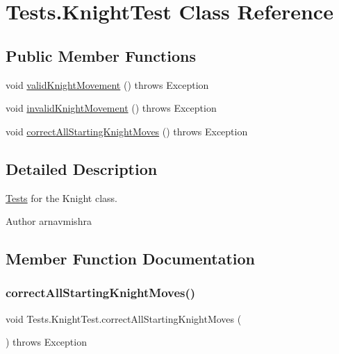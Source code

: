 \hypertarget{class_tests_1_1_knight_test}{}\section{Tests.\+Knight\+Test Class Reference}
\label{class_tests_1_1_knight_test}
\subsection*{Public Member Functions}
\begin{DoxyCompactItemize}
\item 
void \hyperlink{class_tests_1_1_knight_test_aeef4aecba7d22407c8945dabf02ae3fa}{valid\+Knight\+Movement} ()  throws Exception 
\item 
void \hyperlink{class_tests_1_1_knight_test_a2055e2c815f2c80d89a9f9519702b712}{invalid\+Knight\+Movement} ()  throws Exception 
\item 
void \hyperlink{class_tests_1_1_knight_test_a1f2b34d555e7c732d14245368341ee02}{correct\+All\+Starting\+Knight\+Moves} ()  throws Exception 
\end{DoxyCompactItemize}


\subsection{Detailed Description}
\hyperlink{namespace_tests}{Tests} for the Knight class. \begin{DoxyAuthor}{Author}
arnavmishra 
\end{DoxyAuthor}


\subsection{Member Function Documentation}
\hypertarget{class_tests_1_1_knight_test_a1f2b34d555e7c732d14245368341ee02}{}\label{class_tests_1_1_knight_test_a1f2b34d555e7c732d14245368341ee02} 
\subsubsection{\texorpdfstring{correct\+All\+Starting\+Knight\+Moves()}{correctAllStartingKnightMoves()}}
{\footnotesize\ttfamily void Tests.\+Knight\+Test.\+correct\+All\+Starting\+Knight\+Moves (\begin{DoxyParamCaption}{ }\end{DoxyParamCaption}) throws Exception}


